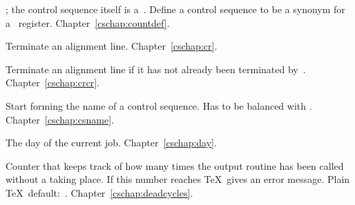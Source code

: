 \begin{glossinventory}
\item [\cs{countdef\gr{control sequence}\gr{equals}\gr{8-bit number}}]
      ; the control sequence
      itself is a~.
      Define a control sequence to be a synonym for
      a~ register.
Chapter~\ref{cschap:countdef}.

\item [\cs{cr}]
      Terminate an alignment line.
Chapter~\ref{cschap:cr}.

\item [\cs{crcr}]
      Terminate an alignment line if it has 
      not already been terminated by~.
Chapter~\ref{cschap:crcr}.

\item [\cs{csname}]
      Start forming the name of a control sequence.
      Has to be balanced with .
Chapter~\ref{cschap:csname}.

\item [\cs{day}]
      The day of the current job.
Chapter~\ref{cschap:day}.

\item [\cs{deadcycles}]
      Counter that keeps track of how many times 
      the output routine has been called without a  
      taking place. 
      If this number reaches  \TeX\
      gives an error message. Plain \TeX\ default:~.
Chapter~\ref{cschap:deadcycles}.


\end{glossinventory}
